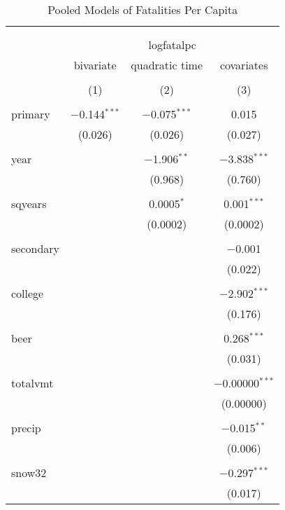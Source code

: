 \documentclass{article}
\begin{document}
\begin{table}[!htbp] \centering 
  \caption{Pooled Models of Fatalities Per Capita} 
  \label{tab:3a} 
\footnotesize 
\begin{tabular}{@{\extracolsep{5pt}}lccc} 
\\[-1.8ex]\hline 
\hline \\[-1.8ex] 
\\[-1.8ex] & \multicolumn{3}{c}{logfatalpc} \\ 
 & bivariate & quadratic time & covariates \\ 
\\[-1.8ex] & (1) & (2) & (3)\\ 
\hline \\[-1.8ex] 
 primary & $-$0.144$^{***}$ & $-$0.075$^{***}$ & 0.015 \\ 
  & (0.026) & (0.026) & (0.027) \\ 
  & & & \\ 
 year &  & $-$1.906$^{**}$ & $-$3.838$^{***}$ \\ 
  &  & (0.968) & (0.760) \\ 
  & & & \\ 
 sqyears &  & 0.0005$^{*}$ & 0.001$^{***}$ \\ 
  &  & (0.0002) & (0.0002) \\ 
  & & & \\ 
 secondary &  &  & $-$0.001 \\ 
  &  &  & (0.022) \\ 
  & & & \\ 
 college &  &  & $-$2.902$^{***}$ \\ 
  &  &  & (0.176) \\ 
  & & & \\ 
 beer &  &  & 0.268$^{***}$ \\ 
  &  &  & (0.031) \\ 
  & & & \\ 
 totalvmt &  &  & $-$0.00000$^{***}$ \\ 
  &  &  & (0.00000) \\ 
  & & & \\ 
 precip &  &  & $-$0.015$^{**}$ \\ 
  &  &  & (0.006) \\ 
  & & & \\ 
 snow32 &  &  & $-$0.297$^{***}$ \\ 
  &  &  & (0.017) \\ 

\end{tabular}
\end{table}
\end{document}
